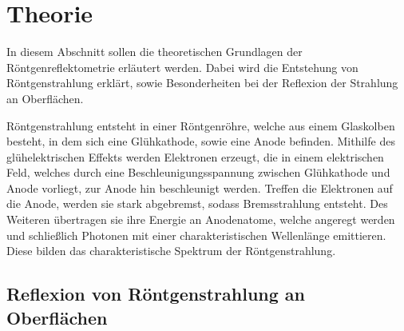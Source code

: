 \section{Theorie}
\label{sec:theorie}

In diesem Abschnitt sollen die theoretischen Grundlagen der Röntgenreflektometrie erläutert werden.
Dabei wird die Entstehung von Röntgenstrahlung erklärt,
sowie Besonderheiten bei der Reflexion der Strahlung an Oberflächen.

Röntgenstrahlung entsteht in einer Röntgenröhre,
welche aus einem Glaskolben besteht,
in dem sich eine Glühkathode,
sowie eine Anode befinden.
Mithilfe des glühelektrischen Effekts werden Elektronen erzeugt,
die in einem elektrischen Feld,
welches durch eine Beschleunigungsspannung zwischen Glühkathode und Anode vorliegt,
zur Anode hin beschleunigt werden.
Treffen die Elektronen auf die Anode,
werden sie stark abgebremst,
sodass Bremsstrahlung entsteht.
Des Weiteren übertragen sie ihre Energie an Anodenatome,
welche angeregt werden und schließlich Photonen mit einer charakteristischen Wellenlänge emittieren.
Diese bilden das charakteristische Spektrum der Röntgenstrahlung.


\subsection{Reflexion von Röntgenstrahlung an Oberflächen}
\label{sec:reflexion_oberflaeche}

